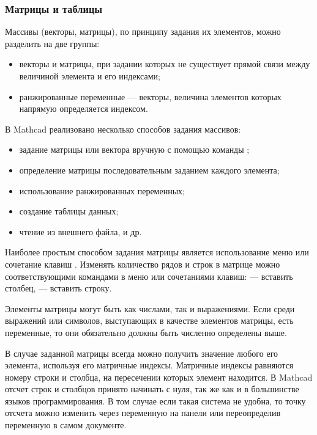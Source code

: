 \subsubsection*{Матрицы и таблицы}
Массивы (векторы, матрицы), по принципу задания их элементов, можно разделить на две группы:
\begin{itemize}
\item векторы и матрицы, при задании которых не существует прямой связи между величиной элемента и его индексами;
\item ранжированные переменные --- векторы, величина элементов которых напрямую определяется индексом.
\end{itemize}
В Mathcad реализовано несколько способов задания массивов:
\begin{itemize}
	\item задание матрицы или вектора вручную с помощью команды ;
	\item определение матрицы последовательным заданием каждого элемента;
	\item использование ранжированных переменных;
	\item создание таблицы данных;
	\item чтение из внешнего файла, и др.
\end{itemize}

Наиболее простым способом задания матрицы является использование меню  или сочетание клавиш . Изменять количество рядов и строк в матрице можно соответствующими командами в меню  или сочетаниями клавиш: \keys{\shift+\enter} --- вставить столбец,    --- вставить строку.

Элементы матрицы могут быть как числами, так и выражениями. Если среди выражений или символов, выступающих в качестве элементов матрицы, есть переменные, то они обязательно должны быть численно определены выше.


В случае заданной матрицы всегда можно получить значение любого его элемента, используя его матричные индексы. Матричные индексы равняются номеру строки и столбца, на пересечении которых элемент находится. В Mathcad отсчет строк и столбцов принято начинать с нуля, так же как и в большинстве языков программирования. В том случае если такая система не удобна, то точку отсчета можно изменить через переменную  на панели   или переопределив переменную в самом документе.

